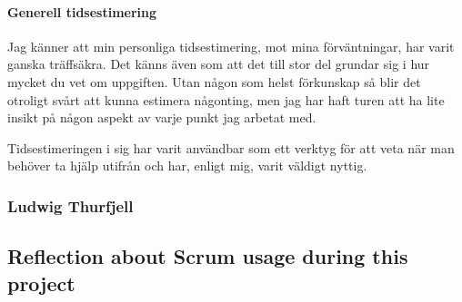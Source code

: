 \paragraph{Generell tidsestimering}

Jag känner att min personliga tidsestimering, mot mina förväntningar, har varit ganska träffsäkra. Det känns även som att det till stor del grundar sig i hur mycket du vet om uppgiften.
Utan någon som helst förkunskap så blir det otroligt svårt att kunna estimera någonting, men jag har haft turen att ha lite insikt på någon aspekt av varje punkt jag arbetat med.

Tidsestimeringen i sig har varit användbar som ett verktyg för att veta när man behöver ta hjälp utifrån och har, enligt mig, varit väldigt nyttig.


\subsubsection{Ludwig Thurfjell}
\subsection{Reflection about Scrum usage during this project}
